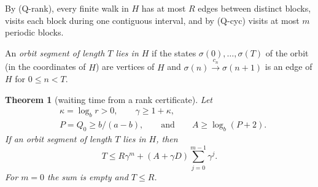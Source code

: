 \documentclass[11pt,reqno]{amsart}
\newtheorem{theorem}{Theorem}
\theoremstyle{definition}
\theoremstyle{remark}
\begin{document}
By (Q-rank), every finite walk in \(H\) has at most \(R\) edges between
distinct blocks, visits each block during one contiguous interval, and
by (Q-cyc) visits at most \(m\) periodic blocks.

An \emph{orbit segment of length \(T\) lies in \(H\)} if the states
\(\sigma(0),\ldots,\sigma(T)\) of the orbit (in the coordinates of
\(H\)) are vertices of \(H\) and \(\sigma(n)\xrightarrow{c_n}\sigma(n+1)\)
is an edge of \(H\) for \(0\le n<T\).

\begin{samepage}
\begin{theorem}[waiting time from a rank certificate]\leavevmode\label{thm:27}
Let
\[
\begin{aligned}
&\kappa=\log_br>0,\qquad \gamma\ge1+\kappa,\\
&P=Q_0\ge b/(a-b),\qquad\text{and}\qquad A\ge\log_b(P+2).
\end{aligned}
\]
If an orbit segment of length \(T\) lies in \(H\),
then
\[
T\le R\gamma^m+(A+\gamma D)\sum_{j=0}^{m-1}\gamma^j .
\tag{24}\label{eq:24}
\]
For \(m=0\) the sum is empty and \(T\le R\).
\label{thm-end:27}
\end{theorem}
\end{samepage}
\end{document}
